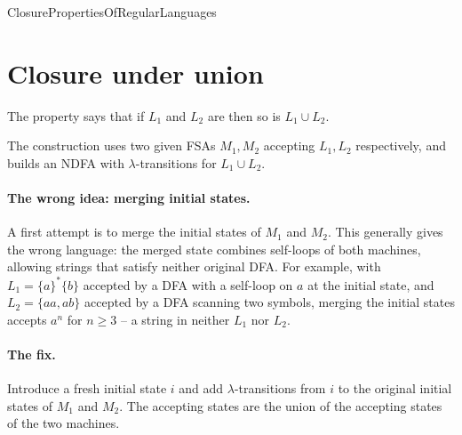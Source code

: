 \documentclass[hidelinks]{article}
\begin{document}
\begin{smodule}[title={Closure Properties of Regular Languages}]{ClosurePropertiesOfRegularLanguages}
\section{Closure under union}

\begin{sdefinition}[for=closure under union]
The  property says that if $L_1$ and $L_2$ are  then so is $L_1 \cup L_2$.
\end{sdefinition}

The construction uses two given FSAs $M_1, M_2$ accepting $L_1, L_2$ respectively, and builds an NDFA with $\lambda$-transitions for $L_1 \cup L_2$.

\paragraph{The wrong idea: merging initial states.} A first attempt is to merge the initial states of $M_1$ and $M_2$. This generally gives the wrong language: the merged state combines self-loops of both machines, allowing strings that satisfy neither original DFA. For example, with $L_1 = \{a\}^* \{b\}$ accepted by a DFA with a self-loop on $a$ at the initial state, and $L_2 = \{a a, a b\}$ accepted by a DFA scanning two symbols, merging the initial states accepts $a^n$ for $n \geq 3$ -- a string in neither $L_1$ nor $L_2$.

\paragraph{The fix.} Introduce a fresh initial state $i$ and add $\lambda$-transitions from $i$ to the original initial states of $M_1$ and $M_2$. The accepting states are the union of the accepting states of the two machines.


\end{smodule}
\end{document}
